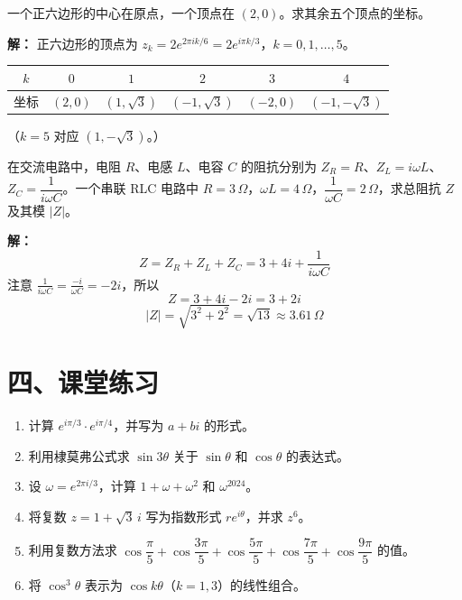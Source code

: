\documentclass[12pt, a4paper]{ctexart}
\begin{document}
\begin{appbox}[【应用2】正多边形的顶点坐标]
一个正六边形的中心在原点，一个顶点在 $(2,0)$。求其余五个顶点的坐标。
\end{appbox}

\textbf{解：}
正六边形的顶点为 $z_k = 2e^{2\pi ik/6} = 2e^{i\pi k/3}$，$k=0,1,\ldots,5$。

\begin{center}
\begin{tabular}{cccccc}
\toprule
$k$ & $0$ & $1$ & $2$ & $3$ & $4$ \\
\midrule
坐标 & $(2,0)$ & $(1,\sqrt{3})$ & $(-1,\sqrt{3})$ & $(-2,0)$ & $(-1,-\sqrt{3})$ \\
\bottomrule
\end{tabular}
\end{center}
（$k=5$ 对应 $(1,-\sqrt{3})$。）

\begin{appbox}[【应用3】交流电路中的复数阻抗]
在交流电路中，电阻 $R$、电感 $L$、电容 $C$ 的阻抗分别为 $Z_R=R$、$Z_L=i\omega L$、$Z_C=\dfrac{1}{i\omega C}$。一个串联 RLC 电路中 $R=3\,\Omega$，$\omega L=4\,\Omega$，$\dfrac{1}{\omega C}=2\,\Omega$，求总阻抗 $Z$ 及其模 $|Z|$。
\end{appbox}

\textbf{解：}
\[
  Z = Z_R + Z_L + Z_C = 3 + 4i + \frac{1}{i\omega C}
\]
注意 $\frac{1}{i\omega C} = \frac{-i}{\omega C} = -2i$，所以
\[
  Z = 3 + 4i - 2i = 3 + 2i
\]
\[
  |Z| = \sqrt{3^2+2^2} = \boxed{\sqrt{13}\approx 3.61\,\Omega}
\]

\section*{\textcolor{tipgreen}{四、课堂练习}}

\begin{enumerate}
  \item 计算 $e^{i\pi/3}\cdot e^{i\pi/4}$，并写为 $a+bi$ 的形式。

  \item 利用棣莫弗公式求 $\sin 3\theta$ 关于 $\sin\theta$ 和 $\cos\theta$ 的表达式。

  \item 设 $\omega = e^{2\pi i/3}$，计算 $1+\omega+\omega^2$ 和 $\omega^{2024}$。

  \item 将复数 $z=1+\sqrt{3}\,i$ 写为指数形式 $re^{i\theta}$，并求 $z^6$。

  \item 利用复数方法求 $\cos\dfrac{\pi}{5}+\cos\dfrac{3\pi}{5}+\cos\dfrac{5\pi}{5}+\cos\dfrac{7\pi}{5}+\cos\dfrac{9\pi}{5}$ 的值。

  \item 将 $\cos^3\theta$ 表示为 $\cos k\theta$（$k=1,3$）的线性组合。
\end{enumerate}
\end{document}

